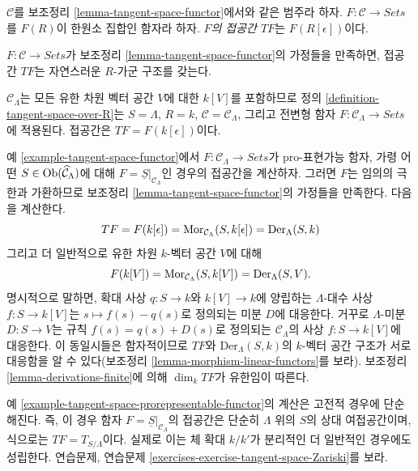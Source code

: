 \begin{definition}
\label{definition-tangent-space-over-R}
$\mathcal{C}$를 보조정리 \ref{lemma-tangent-space-functor}에서와 같은
범주라 하자. $F : \mathcal{C} \to \textit{Sets}$를
$F(R)$이 한원소 집합인 함자라 하자.
{\it $F$의 접공간 $TF$}는 $F(R[\epsilon])$이다.
\end{definition}

\noindent
$F : \mathcal{C} \to \textit{Sets}$가 보조정리
\ref{lemma-tangent-space-functor}의 가정들을 만족하면,
접공간 $TF$는 자연스러운 $R$-가군 구조를 갖는다.

\begin{example}
\label{example-tangent-space-functor}
$\mathcal{C}_\Lambda$는 모든 유한 차원 벡터 공간 $V$에 대한
$k[V]$를 포함하므로 정의 \ref{definition-tangent-space-over-R}는
$S = \Lambda$, $R = k$, $\mathcal{C} = \mathcal{C}_\Lambda$,
그리고 전변형 함자
$F : \mathcal{C}_\Lambda \to \textit{Sets}$에 적용된다.
접공간은 $TF = F(k[\epsilon])$이다.
\end{example}

\begin{example}
\label{example-tangent-space-prorepresentable-functor}
예 \ref{example-tangent-space-functor}에서
$F : \mathcal{C}_\Lambda \to \textit{Sets}$가 pro-표현가능 함자,
가령 어떤 $S \in \mathop{\mathrm{Ob}}\nolimits(\widehat{\mathcal{C}}_\Lambda)$에 대해
$F = \underline{S}|_{\mathcal{C}_\Lambda}$인 경우의 접공간을
계산하자. 그러면 $F$는 임의의 극한과 가환하므로
보조정리 \ref{lemma-tangent-space-functor}의 가정들을 만족한다.
다음을 계산한다.
$$
TF = F(k[\epsilon]) = \mathop{\mathrm{Mor}}\nolimits_{\mathcal{C}_\Lambda}(S, k[\epsilon])
= \text{Der}_\Lambda(S, k)
$$
그리고 더 일반적으로 유한 차원 $k$-벡터 공간 $V$에 대해
$$
F(k[V]) = \mathop{\mathrm{Mor}}\nolimits_{\mathcal{C}_\Lambda}(S, k[V]) = \text{Der}_\Lambda(S, V).
$$
명시적으로 말하면, 확대 사상 $q : S \to k$와
$k[V] \to k$에 양립하는 $\Lambda$-대수 사상
$f : S \to k[V]$는 $s \mapsto f(s) - q(s)$로 정의되는
미분 $D$에 대응한다. 거꾸로 $\Lambda$-미분 $D : S \to V$는
규칙 $f(s) = q(s) + D(s)$로 정의되는
$\mathcal{C}_\Lambda$의 사상 $f : S \to k[V]$에 대응한다.
이 동일시들은 함자적이므로 $TF$와
$\text{Der}_\Lambda(S, k)$의 $k$-벡터 공간 구조가 서로 대응함을
알 수 있다(보조정리 \ref{lemma-morphism-linear-functors}를 보라).
보조정리 \ref{lemma-derivations-finite}에 의해
$\dim_k TF$가 유한임이 따른다.
\end{example}

\begin{example}
\label{example-tangent-space-classical-prorepresentable-functor}
예 \ref{example-tangent-space-prorepresentable-functor}의 계산은
고전적 경우에 단순해진다. 즉, 이 경우 함자
$F = \underline{S}|_{\mathcal{C}_\Lambda}$의 접공간은 단순히
$\Lambda$ 위의 $S$의 상대 여접공간이며, 식으로는
$TF = T_{S/\Lambda}$이다. 실제로 이는 체 확대 $k/k'$가
분리적인 더 일반적인 경우에도 성립한다. 연습문제, 연습문제
\ref{exercises-exercise-tangent-space-Zariski}를 보라.
\end{example}

